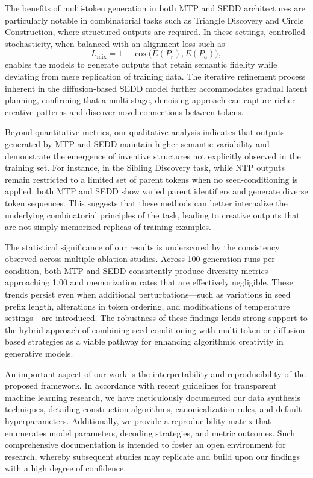 \documentclass[11pt]{article}
\begin{document}
The benefits of multi-token generation in both MTP and SEDD architectures are particularly notable in combinatorial tasks such as Triangle Discovery and Circle Construction, where structured outputs are required. In these settings, controlled stochasticity, when balanced with an alignment loss such as 
\[
L_{\text{mix}} = 1 - \cos\big(E(P_r), E(P_a)\big),
\]
enables the models to generate outputs that retain semantic fidelity while deviating from mere replication of training data. The iterative refinement process inherent in the diffusion-based SEDD model further accommodates gradual latent planning, confirming that a multi-stage, denoising approach can capture richer creative patterns and discover novel connections between tokens.

Beyond quantitative metrics, our qualitative analysis indicates that outputs generated by MTP and SEDD maintain higher semantic variability and demonstrate the emergence of inventive structures not explicitly observed in the training set. For instance, in the Sibling Discovery task, while NTP outputs remain restricted to a limited set of parent tokens when no seed-conditioning is applied, both MTP and SEDD show varied parent identifiers and generate diverse token sequences. This suggests that these methods can better internalize the underlying combinatorial principles of the task, leading to creative outputs that are not simply memorized replicas of training examples.

The statistical significance of our results is underscored by the consistency observed across multiple ablation studies. Across 100 generation runs per condition, both MTP and SEDD consistently produce diversity metrics approaching 1.00 and memorization rates that are effectively negligible. These trends persist even when additional perturbations—such as variations in seed prefix length, alterations in token ordering, and modifications of temperature settings—are introduced. The robustness of these findings lends strong support to the hybrid approach of combining seed-conditioning with multi-token or diffusion-based strategies as a viable pathway for enhancing algorithmic creativity in generative models.

An important aspect of our work is the interpretability and reproducibility of the proposed framework. In accordance with recent guidelines for transparent machine learning research, we have meticulously documented our data synthesis techniques, detailing construction algorithms, canonicalization rules, and default hyperparameters. Additionally, we provide a reproducibility matrix that enumerates model parameters, decoding strategies, and metric outcomes. Such comprehensive documentation is intended to foster an open environment for research, whereby subsequent studies may replicate and build upon our findings with a high degree of confidence.
\end{document}
